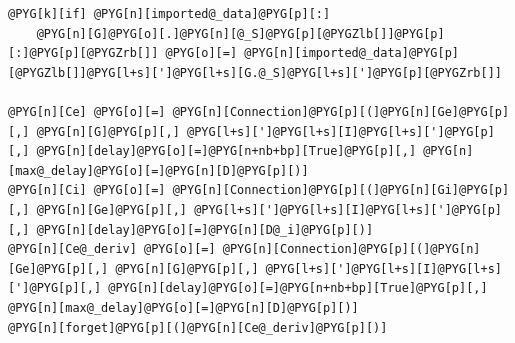 \documentclass[letterpaper,10pt,english]{manual}
\begin{document}
\begin{Verbatim}[commandchars=@\[\]]
@PYG[k][if] @PYG[n][imported@_data]@PYG[p][:]
    @PYG[n][G]@PYG[o][.]@PYG[n][@_S]@PYG[p][@PYGZlb[]]@PYG[p][:]@PYG[p][@PYGZrb[]] @PYG[o][=] @PYG[n][imported@_data]@PYG[p][@PYGZlb[]]@PYG[l+s][']@PYG[l+s][G.@_S]@PYG[l+s][']@PYG[p][@PYGZrb[]]

@PYG[n][Ce] @PYG[o][=] @PYG[n][Connection]@PYG[p][(]@PYG[n][Ge]@PYG[p][,] @PYG[n][G]@PYG[p][,] @PYG[l+s][']@PYG[l+s][I]@PYG[l+s][']@PYG[p][,] @PYG[n][delay]@PYG[o][=]@PYG[n+nb+bp][True]@PYG[p][,] @PYG[n][max@_delay]@PYG[o][=]@PYG[n][D]@PYG[p][)]
@PYG[n][Ci] @PYG[o][=] @PYG[n][Connection]@PYG[p][(]@PYG[n][Gi]@PYG[p][,] @PYG[n][Ge]@PYG[p][,] @PYG[l+s][']@PYG[l+s][I]@PYG[l+s][']@PYG[p][,] @PYG[n][delay]@PYG[o][=]@PYG[n][D@_i]@PYG[p][)]
@PYG[n][Ce@_deriv] @PYG[o][=] @PYG[n][Connection]@PYG[p][(]@PYG[n][Ge]@PYG[p][,] @PYG[n][G]@PYG[p][,] @PYG[l+s][']@PYG[l+s][I]@PYG[l+s][']@PYG[p][,] @PYG[n][delay]@PYG[o][=]@PYG[n+nb+bp][True]@PYG[p][,] @PYG[n][max@_delay]@PYG[o][=]@PYG[n][D]@PYG[p][)]
@PYG[n][forget]@PYG[p][(]@PYG[n][Ce@_deriv]@PYG[p][)]


\end{Verbatim}
\end{document}
